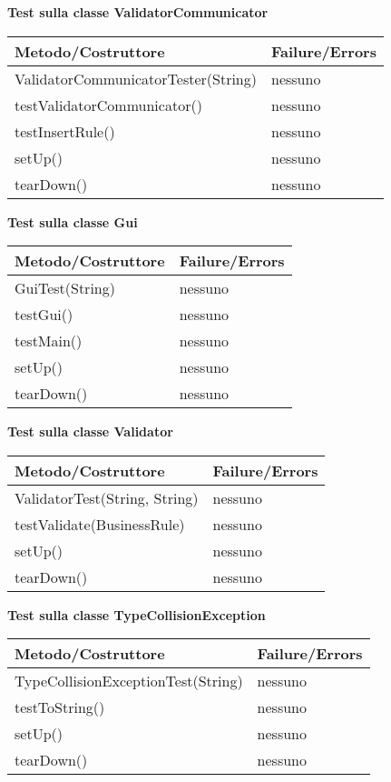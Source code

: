 \textbf{Test sulla classe ValidatorCommunicator}\\
\begin{center}
\begin{tabular}{|p{}|p{3 cm}|} \hline
\textbf{Metodo/Costruttore} & \textbf{Failure/Errors} \\ \hline
ValidatorCommunicatorTester(String) & nessuno \\ \hline
testValidatorCommunicator() & nessuno \\ \hline
testInsertRule() & nessuno \\ \hline
setUp() & nessuno \\ \hline
tearDown() & nessuno \\ \hline
\end{tabular}
\end{center}


\textbf{Test sulla classe Gui}\\
\begin{center}
\begin{tabular}{|p{}|p{3 cm}|} \hline
\textbf{Metodo/Costruttore} & \textbf{Failure/Errors} \\ \hline
GuiTest(String) & nessuno \\ \hline
testGui() & nessuno \\ \hline
testMain() & nessuno \\ \hline
setUp() & nessuno \\ \hline
tearDown() & nessuno \\ \hline
\end{tabular}
\end{center}

\textbf{Test sulla classe Validator}\\
\begin{center}
\begin{tabular}{|p{}|p{3 cm}|} \hline
\textbf{Metodo/Costruttore} & \textbf{Failure/Errors} \\ \hline
ValidatorTest(String, String) & nessuno \\ \hline
testValidate(BusinessRule) & nessuno \\ \hline
setUp() & nessuno \\ \hline
tearDown() & nessuno \\ \hline
\end{tabular}
\end{center}

\textbf{Test sulla classe TypeCollisionException}\\
\begin{center}
\begin{tabular}{|p{}|p{3 cm}|} \hline
\textbf{Metodo/Costruttore} & \textbf{Failure/Errors} \\ \hline
TypeCollisionExceptionTest(String) & nessuno \\ \hline
testToString() & nessuno \\ \hline
setUp() & nessuno \\ \hline
tearDown() & nessuno \\ \hline
\end{tabular}
\end{center}

